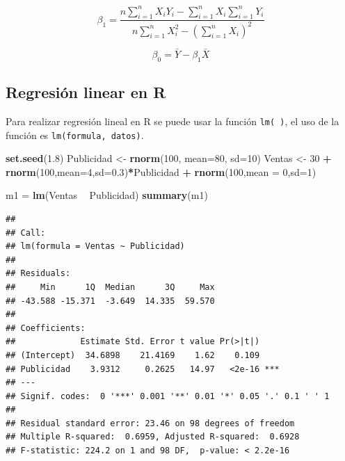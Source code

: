 \documentclass[]{book}
\newenvironment{Shaded}{\begin{snugshade}}{\end{snugshade}}
\newcommand{\DataTypeTok}[1]{\textcolor[rgb]{0.13,0.29,0.53}{#1}}
\newcommand{\DecValTok}[1]{\textcolor[rgb]{0.00,0.00,0.81}{#1}}
\newcommand{\FloatTok}[1]{\textcolor[rgb]{0.00,0.00,0.81}{#1}}
\newcommand{\KeywordTok}[1]{\textcolor[rgb]{0.13,0.29,0.53}{\textbf{#1}}}
\newcommand{\NormalTok}[1]{#1}
\newcommand{\OperatorTok}[1]{\textcolor[rgb]{0.81,0.36,0.00}{\textbf{#1}}}
\newcommand{\StringTok}[1]{\textcolor[rgb]{0.31,0.60,0.02}{#1}}
\begin{document}
\begin{equation}
\beta_1 = \dfrac{n\sum_{i=1}^{n}{X_iY_i}-\sum_{i=1}^{n}{X_i}\sum_{i=1}^{n}{Y_i}}{n\sum_{i=1}^{n}{X_i^2}-\left(\sum_{i=1}^{n}{X_i}\right)^2}
    \label{eq:pendiente}
\end{equation}

\begin{equation}
\beta_0 = \bar{Y}-\beta_1\bar{X}
    \label{eq:inter}
\end{equation}

\hypertarget{regresion-linear-en-r}{%
\subsection{Regresión linear en R}\label{regresion-linear-en-r}}

Para realizar regresión lineal en R se puede usar la función \texttt{lm(\ )}, el uso de la función es \texttt{lm(formula,\ datos)}.

\begin{Shaded}
\begin{Highlighting}[]
\KeywordTok{set.seed}\NormalTok{(}\FloatTok{1.8}\NormalTok{)}
\NormalTok{Publicidad <-}\StringTok{ }\KeywordTok{rnorm}\NormalTok{(}\DecValTok{100}\NormalTok{, }\DataTypeTok{mean=}\DecValTok{80}\NormalTok{, }\DataTypeTok{sd=}\DecValTok{10}\NormalTok{)}
\NormalTok{Ventas <-}\StringTok{ }\DecValTok{30} \OperatorTok{+}\StringTok{ }\KeywordTok{rnorm}\NormalTok{(}\DecValTok{100}\NormalTok{,}\DataTypeTok{mean=}\DecValTok{4}\NormalTok{,}\DataTypeTok{sd=}\FloatTok{0.3}\NormalTok{)}\OperatorTok{*}\NormalTok{Publicidad }\OperatorTok{+}\StringTok{ }\KeywordTok{rnorm}\NormalTok{(}\DecValTok{100}\NormalTok{,}\DataTypeTok{mean =} \DecValTok{0}\NormalTok{,}\DataTypeTok{sd=}\DecValTok{1}\NormalTok{)}

\NormalTok{m1 =}\StringTok{ }\KeywordTok{lm}\NormalTok{(Ventas }\OperatorTok{~}\StringTok{ }\NormalTok{Publicidad)}
\KeywordTok{summary}\NormalTok{(m1)}
\end{Highlighting}
\end{Shaded}

\begin{verbatim}
## 
## Call:
## lm(formula = Ventas ~ Publicidad)
## 
## Residuals:
##     Min      1Q  Median      3Q     Max 
## -43.588 -15.371  -3.649  14.335  59.570 
## 
## Coefficients:
##             Estimate Std. Error t value Pr(>|t|)    
## (Intercept)  34.6898    21.4169    1.62    0.109    
## Publicidad    3.9312     0.2625   14.97   <2e-16 ***
## ---
## Signif. codes:  0 '***' 0.001 '**' 0.01 '*' 0.05 '.' 0.1 ' ' 1
## 
## Residual standard error: 23.46 on 98 degrees of freedom
## Multiple R-squared:  0.6959, Adjusted R-squared:  0.6928 
## F-statistic: 224.2 on 1 and 98 DF,  p-value: < 2.2e-16
\end{verbatim}
\end{document}
